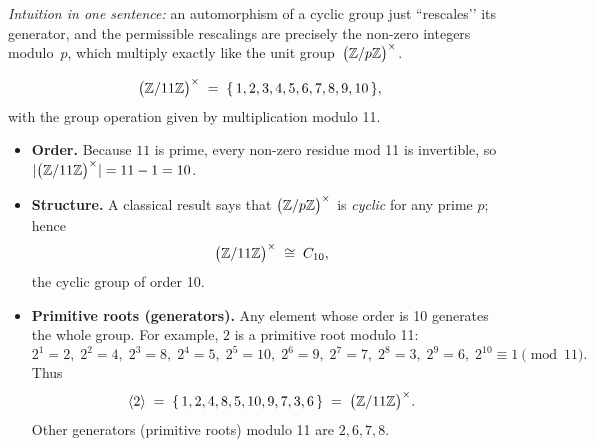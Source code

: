 \documentclass[12pt]{article}
\theoremstyle{definition} %
\theoremstyle{plain} %
\begin{document}
\medskip
\textit{Intuition in one sentence:}  
an automorphism of a cyclic group just “rescales’’ its generator,
and the permissible rescalings are precisely the non-zero
integers modulo~$p$, which multiply exactly like
the unit group~$\bigl(\mathbb{Z}/p\mathbb{Z}\bigr)^{\times}$.

\newcommand{\units}[1]{\bigl(\Z/#1\Z\bigr)^{\times}}

\[
  \units{11}
  \;=\;
  \{\,1,2,3,4,5,6,7,8,9,10\,\},
\]
with the group operation given by multiplication modulo 11.

\begin{itemize}
  \item \textbf{Order.}  
        Because \(11\) is prime, every non-zero residue mod 11 is invertible,  
        so \(|\units{11}| = 11-1 = 10\).

  \item \textbf{Structure.}  
        A classical result says that \(\units{p}\) is \emph{cyclic} for any prime \(p\);  
        hence
        \[
            \units{11}\;\cong\;C_{10},
        \]
        the cyclic group of order 10.

  \item \textbf{Primitive roots (generators).}  
        Any element whose order is 10 generates the whole group.
        For example, \(2\) is a primitive root modulo 11:
        \[
           2^1= 2,\;
           2^2= 4,\;
           2^3= 8,\;
           2^4= 5,\;
           2^5=10,\;
           2^6= 9,\;
           2^7= 7,\;
           2^8= 3,\;
           2^9= 6,\;
           2^{10}\equiv 1\pmod{11}.
        \]
        Thus
        \[
           \langle 2\rangle
           \;=\;
           \{\,1,2,4,8,5,10,9,7,3,6\,\}
           \;=\;\units{11}.
        \]
        Other generators (primitive roots) modulo 11 are \(2, 6, 7, 8\).
\end{itemize}
\end{document}
